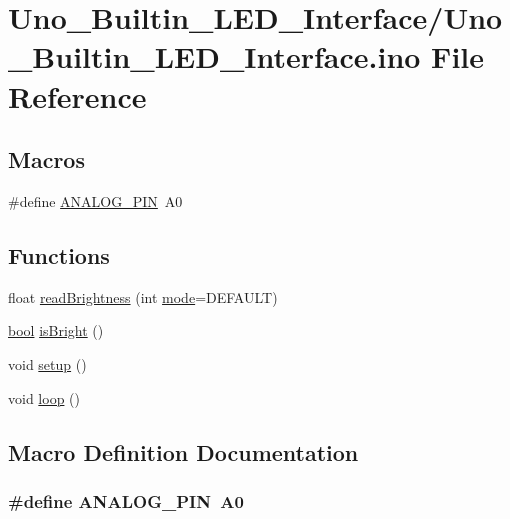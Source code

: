 \hypertarget{Uno__Builtin__LED__Interface_8ino}{\section{Uno\-\_\-\-Builtin\-\_\-\-L\-E\-D\-\_\-\-Interface/\-Uno\-\_\-\-Builtin\-\_\-\-L\-E\-D\-\_\-\-Interface.ino File Reference}
\label{Uno__Builtin__LED__Interface_8ino}
}
\subsection*{Macros}
\begin{DoxyCompactItemize}
\item 
\#define \hyperlink{Uno__Builtin__LED__Interface_8ino_acf511cb1e4527ed0a8e1e453de97697a}{A\-N\-A\-L\-O\-G\-\_\-\-P\-I\-N}~A0
\end{DoxyCompactItemize}
\subsection*{Functions}
\begin{DoxyCompactItemize}
\item 
float \hyperlink{Uno__Builtin__LED__Interface_8ino_a24d1ec07488c2300e2cdbc1498810ed5}{read\-Brightness} (int \hyperlink{USBtxEx_8ino_a1ea5d0cb93f22f7d0fdf804bd68c3326}{mode}=D\-E\-F\-A\-U\-L\-T)
\item 
\hyperlink{stdbool_8h_abb452686968e48b67397da5f97445f5b}{bool} \hyperlink{Uno__Builtin__LED__Interface_8ino_ace485a349af5aba8bff8f9469c1e8344}{is\-Bright} ()
\item 
void \hyperlink{Uno__Builtin__LED__Interface_8ino_a4fc01d736fe50cf5b977f755b675f11d}{setup} ()
\item 
void \hyperlink{Uno__Builtin__LED__Interface_8ino_afe461d27b9c48d5921c00d521181f12f}{loop} ()
\end{DoxyCompactItemize}


\subsection{Macro Definition Documentation}
\hypertarget{Uno__Builtin__LED__Interface_8ino_acf511cb1e4527ed0a8e1e453de97697a}{
\subsubsection[{A\-N\-A\-L\-O\-G\-\_\-\-P\-I\-N}]{\setlength{\rightskip}{0pt plus 5cm}\#define A\-N\-A\-L\-O\-G\-\_\-\-P\-I\-N~A0}}\label{Uno__Builtin__LED__Interface_8ino_acf511cb1e4527ed0a8e1e453de97697a}


